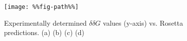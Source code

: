 \begin{figure}
  \centering
  \texttt{[image: \%\%fig-path\%\%]}
  \caption{
    Experimentally determined $\delta\delta G$ values (y-axis) vs. Rosetta predictions.
    (a) %
    (b) %
    (c) %
    (d) %
  } \label{tab:figure-2}
\end{figure}
